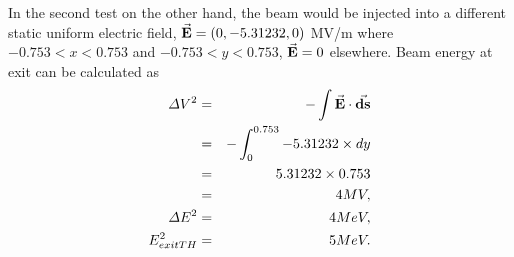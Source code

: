 \documentclass[a4paper,oneside,12pt]{report}
\numberwithin{equation}{chapter}
\begin{document}
{In the second test on the other hand, the beam would be injected into a different static uniform electric field,
$\vec{\textbf{E}}=(0, -5.31232, 0)$ MV/m where $-0.753<x<0.753$ and $-0.753<y<0.753$, $\vec{\textbf{E}}=0$ elsewhere.
Beam energy at exit can be calculated as
\vspace{-10pt}\begin{eqnarray}
    \Delta V^2   &=& - \int \dotProdBF{E}{ds} \nonumber \\
                 &=& - \int_{0}^{0.753} -5.31232 \times dy \nonumber \\
                 &=& 5.31232 \times 0.753 \nonumber \\
                 &=& 4 MV, \\
    \Delta E^2   &=& 4 MeV, \\
    E_{exitTH}^2 &=& 5 MeV.
\vspace{-10pt}\end{eqnarray}

}
\end{document}
